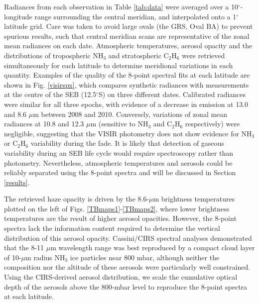 \documentclass[final,5p,times,twocolumn,authoryear]{elsarticle}
\newcommand{\degree}{\ensuremath{^\circ}}
\begin{document}
Radiances from each observation in Table \ref{tab:data} were averaged over a 10$^\circ$-longitude range surrounding the central meridian, and interpolated onto a 1\degree latitude grid. Care was taken to avoid large ovals (the GRS, Oval BA) to prevent spurious results, such that central meridian scans are representative of the zonal mean radiances on each date.  Atmospheric temperatures, aerosol opacity and the distributions of tropospheric NH$_3$ and stratospheric C$_2$H$_6$ were retrieved simultaneously for each latitude to determine meridional variations in each quantity.   Examples of the quality of the 8-point spectral fits at each latitude are shown in Fig. \ref{visirspx}, which compares synthetic radiances with measurements at the centre of the SEB (12.5$^\circ$S) on three different dates.  Calibrated radiances were similar for all three epochs, with evidence of a decrease in emission at 13.0 and 8.6 $\mu$m between 2008 and 2010.  Conversely, variations of zonal mean radiances at 10.8 and 12.3 $\mu$m (sensitive to NH$_3$ and C$_2$H$_6$ respectively) were negligible, suggesting that the VISIR photometry does not show evidence for NH$_3$ or C$_2$H$_6$ variability during the fade.  It is likely that detection of gaseous variability during an SEB life cycle would require spectroscopy rather than photometry.  Nevertheless, atmospheric temperatures and aerosols could be reliably separated using the 8-point spectra and will be discussed in Section \ref{results}.

The retrieved haze opacity is driven by the 8.6-$\mu$m brightness temperatures plotted on the left of Figs. \ref{TBmaps1}-\ref{TBmaps2}, where lower brightness temperatures are the result of higher aerosol opacities.  However, the 8-point spectra lack the information content required to determine the vertical distribution of this aerosol opacity.  Cassini/CIRS spectral analyses \citep{04wong, 05matcheva, 09fletcher_ph3} demonstrated that the 8-11 $\mu$m wavelength range was best reproduced by a compact cloud layer of 10-$\mu$m radius NH$_3$ ice particles near 800 mbar, although neither the composition nor the altitude of these aerosols were particularly well constrained.  Using the CIRS-derived aerosol distribution, we scale the cumulative optical depth of the aerosols above the 800-mbar level to reproduce the 8-point spectra at each latitude.  
\end{document}
